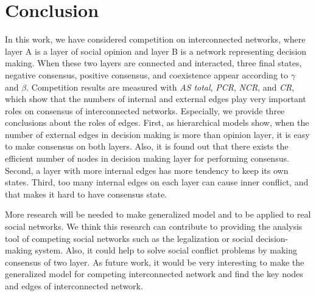 \documentclass[english]{cccconf}
\begin{document}
\section{Conclusion}
In this work, we have considered competition on interconnected networks, where layer A is a layer of social opinion and layer B is a network representing decision making. When these two layers are connected and interacted, three final states, negative consensus, positive consensus, and coexistence appear according to $\gamma$ and $\beta$. Competition results are measured with \textit{AS total}, \textit{PCR}, \textit{NCR}, and \textit{CR}, which show that the numbers of internal and external edges play very important roles on consensus of interconnected networks. Especially, we provide three conclusions about the roles of edges. First, as hierarchical models show, when the number of external edges in decision making is more than opinion layer, it is easy to make consensus on both layers.  Also, it is found out that there exists the efficient number of nodes in decision making layer for performing consensus. Second, a layer with more internal edges has more tendency to keep its own states. Third, too many internal edges on each layer can cause inner conflict, and that makes it hard to have consensus state.  

More research will be needed to make generalized model and to be applied to real social networks. We think this research can contribute to providing the analysis tool of competing social networks such as the legalization or social decision-making system. Also, it could help to solve social conflict problems by making consensus of two layer. As future work, it would be very interesting to make the generalized model for competing interconnected network and find the key nodes and edges of interconnected network.
\end{document}
